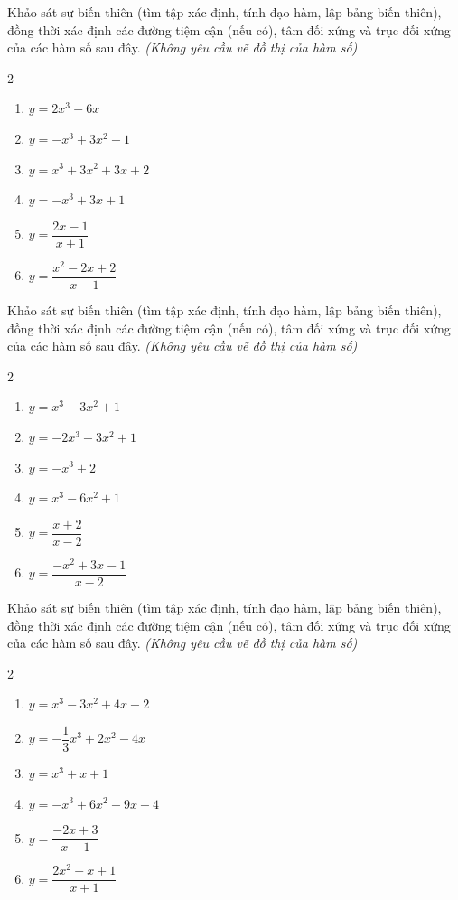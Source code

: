 \documentclass[12pt]{article}
\begin{document}
	\begin{btxanh}
		Khảo sát sự biến thiên (tìm tập xác định, tính đạo hàm, lập bảng biến thiên), đồng thời xác định các đường tiệm cận (nếu có), tâm đối xứng và trục đối xứng của các hàm số sau đây. \textit{(Không yêu cầu vẽ đồ thị của hàm số)}
		\begin{multicols}{2}
			\begin{enumerate}[label=\alph*), itemsep=10pt]
				\item $y = 2x^3 - 6x$
				\item $y = -x^3 + 3x^2 - 1$
				\item $y = x^3 + 3x^2 + 3x + 2$
				\item $y = -x^3 + 3x + 1$
				\item $y = \dfrac{2x - 1}{x + 1}$
				\item $y = \dfrac{x^2 - 2x + 2}{x - 1}$
			\end{enumerate}
		\end{multicols}
	\end{btxanh}
	
	\begin{btvang}
		Khảo sát sự biến thiên (tìm tập xác định, tính đạo hàm, lập bảng biến thiên), đồng thời xác định các đường tiệm cận (nếu có), tâm đối xứng và trục đối xứng của các hàm số sau đây. \textit{(Không yêu cầu vẽ đồ thị của hàm số)}
		\begin{multicols}{2}
			\begin{enumerate}[label=\alph*), itemsep=10pt]
				\item $y = x^3 - 3x^2 + 1$
				\item $y = -2x^3 - 3x^2 + 1$
				\item $y = -x^3 + 2$
				\item $y = x^3 - 6x^2 + 1$
				\item $y = \dfrac{x + 2}{x - 2}$
				\item $y = \dfrac{-x^2 + 3x - 1}{x - 2}$
			\end{enumerate}
		\end{multicols}
	\end{btvang}
	
	\begin{btdo}
		Khảo sát sự biến thiên (tìm tập xác định, tính đạo hàm, lập bảng biến thiên), đồng thời xác định các đường tiệm cận (nếu có), tâm đối xứng và trục đối xứng của các hàm số sau đây. \textit{(Không yêu cầu vẽ đồ thị của hàm số)}
		\begin{multicols}{2}
			\begin{enumerate}[label=\alph*), itemsep=10pt]
				\item $y = x^3 - 3x^2 + 4x - 2$
				\item $y = -\dfrac{1}{3}x^3 + 2x^2 - 4x$
				\item $y = x^3 + x + 1$
				\item $y = -x^3 + 6x^2 - 9x + 4$
				\item $y = \dfrac{-2x + 3}{x - 1}$
				\item $y = \dfrac{2x^2 - x + 1}{x + 1}$
			\end{enumerate}
		\end{multicols}
	\end{btdo}
	
\end{document}
